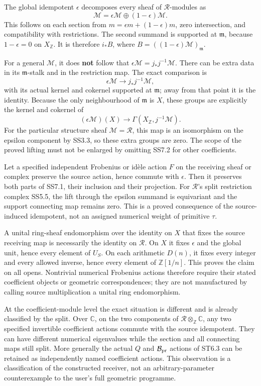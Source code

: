 The global idempotent \(\epsilon\) decomposes every sheaf of
\(\mathcal R\)-modules as \[
 \mathcal M=\epsilon\mathcal M\oplus(1-\epsilon)\mathcal M.
\tag{SS7.1}
\] This follows on each section from \(m=\epsilon m+(1-\epsilon)m\),
zero intersection, and compatibility with restrictions. The second
summand is supported at \(\mathfrak m\), because \(1-\epsilon=0\) on
\(X_{\mathbb Z}\). It is therefore \(i_*B\), where
\(B=((1-\epsilon)\mathcal M)_{\mathfrak m}\).

For a general \(\mathcal M\), it does \textbf{not} follow that
\(\epsilon\mathcal M=j_*j^{-1}\mathcal M\). There can be extra data in
its \(\mathfrak m\)-stalk and in the restriction map. The exact
comparison is \[
 \epsilon\mathcal M\longrightarrow j_*j^{-1}\mathcal M,
\tag{SS7.2}
\] with its actual kernel and cokernel supported at \(\mathfrak m\);
away from that point it is the identity. Because the only neighbourhood
of \(\mathfrak m\) is \(X\), these groups are explicitly the kernel and
cokernel of \[
 (\epsilon\mathcal M)(X)\longrightarrow
 \Gamma(X_{\mathbb Z},j^{-1}\mathcal M).
\tag{SS7.3}
\] For the particular structure sheaf \(\mathcal M=\mathcal R\), this
map is an isomorphism on the epsilon component by SS3.3, so these extra
groups are zero. The scope of the proved lifting must not be enlarged by
omitting SS7.2 for other coefficients.

Let a specified independent Frobenius or idèle action \(F\) on the
receiving sheaf or complex preserve the source action, hence commute
with \(\epsilon\). Then it preserves both parts of SS7.1, their
inclusion and their projection. For \(\mathcal R\)'s split restriction
complex SS5.5, the lift through the epsilon summand is equivariant and
the support connecting map remains zero. This is a proved consequence of
the source-induced idempotent, not an assigned numerical weight of
primitive \(\tau\).

A unital ring-sheaf endomorphism over the identity on \(X\) that fixes
the source receiving map is necessarily the identity on \(\mathcal R\).
On \(X\) it fixes \(\epsilon\) and the global unit, hence every element
of \(U_S\). On each arithmetic \(D(n)\), it fixes every integer and
every allowed inverse, hence every element of \(\mathbb Z[1/n]\). This
proves the claim on all opens. Nontrivial numerical Frobenius actions
therefore require their stated coefficient objects or geometric
correspondences; they are not manufactured by calling source
multiplication a unital ring endomorphism.

At the coefficient-module level the exact situation is different and is
already classified by the split. Over \(\mathbb C\), on the two
components of \(\mathcal R\otimes_{\mathbb Z}\mathbb C\), any two
specified invertible coefficient actions commute with the source
idempotent. They can have different numerical eigenvalues while the
section and all connecting maps still split. More generally the actual
\(Q\) and \(\mathcal B_{\rm pr}\) actions of ST6.3 can be retained as
independently named coefficient actions. This observation is a
classification of the constructed receiver, not an arbitrary-parameter
counterexample to the user's full geometric programme.

